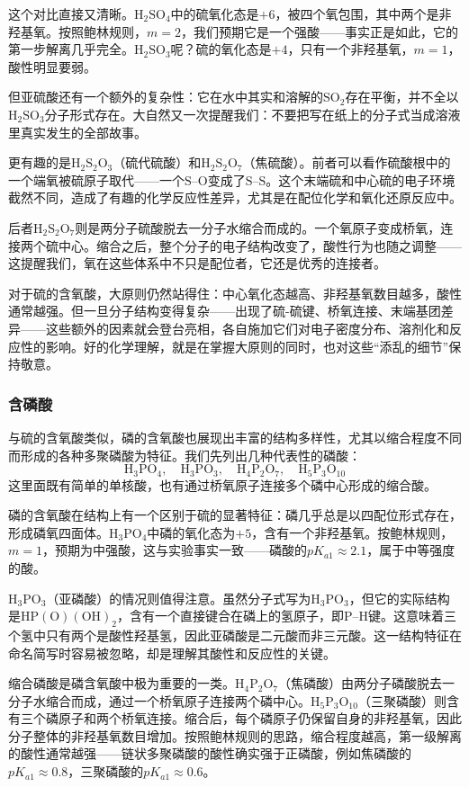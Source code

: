 \documentclass[UTF8]{ctexbook}
\begin{document}
这个对比直接又清晰。$\mathrm{H_2SO_4}$中的硫氧化态是$+6$，被四个氧包围，其中两个是非羟基氧。按照鲍林规则，$m=2$，我们预期它是一个强酸——事实正是如此，它的第一步解离几乎完全。$\mathrm{H_2SO_3}$呢？硫的氧化态是$+4$，只有一个非羟基氧，$m=1$，酸性明显要弱。

但亚硫酸还有一个额外的复杂性：它在水中其实和溶解的$\mathrm{SO_2}$存在平衡，并不全以$\mathrm{H_2SO_3}$分子形式存在。大自然又一次提醒我们：不要把写在纸上的分子式当成溶液里真实发生的全部故事。


更有趣的是$\mathrm{H_2S_2O_3}$（硫代硫酸）和$\mathrm{H_2S_2O_7}$（焦硫酸）。前者可以看作硫酸根中的一个端氧被硫原子取代——一个$\mathrm{S}$--$\mathrm{O}$变成了$\mathrm{S}$--$\mathrm{S}$。这个末端硫和中心硫的电子环境截然不同，造成了有趣的化学反应性差异，尤其是在配位化学和氧化还原反应中。

后者$\mathrm{H_2S_2O_7}$则是两分子硫酸脱去一分子水缩合而成的。一个氧原子变成桥氧，连接两个硫中心。缩合之后，整个分子的电子结构改变了，酸性行为也随之调整——这提醒我们，氧在这些体系中不只是配位者，它还是优秀的连接者。

对于硫的含氧酸，大原则仍然站得住：中心氧化态越高、非羟基氧数目越多，酸性通常越强。但一旦分子结构变得复杂——出现了硫-硫键、桥氧连接、末端基团差异——这些额外的因素就会登台亮相，各自施加它们对电子密度分布、溶剂化和反应性的影响。好的化学理解，就是在掌握大原则的同时，也对这些“添乱的细节”保持敬意。

\subsubsection{含磷酸}

与硫的含氧酸类似，磷的含氧酸也展现出丰富的结构多样性，尤其以缩合程度不同而形成的各种多聚磷酸为特征。我们先列出几种代表性的磷酸：
$$
\mathrm{H_3PO_4,\quad H_3PO_3,\quad H_4P_2O_7,\quad H_5P_3O_{10}}
$$
这里面既有简单的单核酸，也有通过桥氧原子连接多个磷中心形成的缩合酸。

磷的含氧酸在结构上有一个区别于硫的显著特征：磷几乎总是以四配位形式存在，形成磷氧四面体。$\mathrm{H_3PO_4}$中磷的氧化态为$+5$，含有一个非羟基氧。按鲍林规则，$m=1$，预期为中强酸，这与实验事实一致——磷酸的$pK_{a1}\approx2.1$，属于中等强度的酸。

$\mathrm{H_3PO_3}$（亚磷酸）的情况则值得注意。虽然分子式写为$\mathrm{H_3PO_3}$，但它的实际结构是$\mathrm{HP(O)(OH)_2}$，含有一个直接键合在磷上的氢原子，即P--H键。这意味着三个氢中只有两个是酸性羟基氢，因此亚磷酸是二元酸而非三元酸。这一结构特征在命名简写时容易被忽略，却是理解其酸性和反应性的关键。

缩合磷酸是磷含氧酸中极为重要的一类。$\mathrm{H_4P_2O_7}$（焦磷酸）由两分子磷酸脱去一分子水缩合而成，通过一个桥氧原子连接两个磷中心。$\mathrm{H_5P_3O_{10}}$（三聚磷酸）则含有三个磷原子和两个桥氧连接。缩合后，每个磷原子仍保留自身的非羟基氧，因此分子整体的非羟基氧数目增加。按照鲍林规则的思路，缩合程度越高，第一级解离的酸性通常越强——链状多聚磷酸的酸性确实强于正磷酸，例如焦磷酸的$pK_{a1}\approx0.8$，三聚磷酸的$pK_{a1}\approx0.6$。
\end{document}
